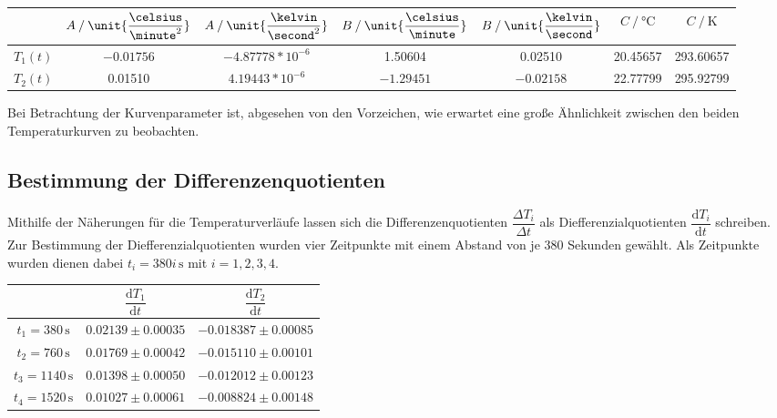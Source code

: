 \begin{table}[H]
  \centering
  \label{tab:ApproxTemp}
  \begin{tabular}{S S S S S S[table-format=2.5] S[table-format=3.5]}
    \toprule
    & {$A \mathbin{/} \unit{\dfrac{\celsius}{\minute^2}}$} & {$A \mathbin{/} \unit{\dfrac{\kelvin}{\second^2}}$} 
    & {$B \mathbin{/} \unit{\dfrac{\celsius}{\minute}}$} & {$B \mathbin{/} \unit{\dfrac{\kelvin}{\second}}$} 
    & {$C \mathbin{/} \unit{\celsius}$} &  {$C \mathbin{/} \unit{\kelvin}$} \\
    \midrule
    {$T_1(t)$} & {$-0.01756$} &  {$-4.87778*10^{-6}$} & {1.50604} & {0.02510} & {20.45657} & {293.60657} \\
    {$T_2(t)$} & {0.01510} & {$4.19443*10^{-6}$} & {$-1.29451$} & {$-0.02158$} & {22.77799} & {295.92799} \\
    \bottomrule
  \end{tabular}
\end{table}
Bei Betrachtung der Kurvenparameter ist, abgesehen von den Vorzeichen, wie erwartet eine große Ähnlichkeit zwischen den
beiden Temperaturkurven zu beobachten.

\newpage

\subsection{Bestimmung der Differenzenquotienten}

Mithilfe der Näherungen für die Temperaturverläufe lassen sich die Differenzenquotienten $\dfrac{ΔT_i}{Δt}$ als Diefferenzialquotienten
$\dfrac{\text{d}T_i}{\text{d}t}$ schreiben.
Zur Bestimmung der Diefferenzialquotienten wurden vier Zeitpunkte mit einem Abstand von je 380 Sekunden gewählt.
Als Zeitpunkte wurden dienen dabei $t_i = 380i \, \unit{\second}$ mit $i=1,2,3,4$.

\begin{table}[H]
  \centering
  \label{tab:Diffquo}
  \begin{tabular}{S S S}
    \toprule
    & {$\dfrac{\text{d}T_1}{\text{d}t}$} & {$\dfrac{\text{d}T_2}{\text{d}t}$} \\
    \midrule
    {$t_1 = 380  \, \unit{\second}$} & {$0.02139 \pm 0.00035$} & {$-0.018387 \pm 0.00085$} \\
    {$t_2 = 760  \, \unit{\second}$} & {$0.01769 \pm 0.00042$} & {$-0.015110 \pm 0.00101$} \\
    {$t_3 = 1140 \, \unit{\second}$} & {$0.01398 \pm 0.00050$} & {$-0.012012 \pm 0.00123$} \\
    {$t_4 = 1520 \, \unit{\second}$} & {$0.01027 \pm 0.00061$} & {$-0.008824 \pm 0.00148$} \\
    \bottomrule
  \end{tabular}
\end{table}

